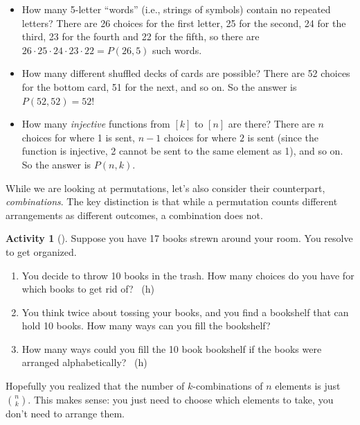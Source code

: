 \documentclass[10pt,]{book}
\theoremstyle{plain}
\theoremstyle{definition}
\theoremstyle{definition}
\theoremstyle{definition}
\newtheorem{activity}[project]{Activity}
\numberwithin{equation}{chapter}
\begin{document}
\begin{itemize}[label=\textbullet]
\item{}\hypertarget{p-654}{}%
How many 5-letter ``words'' (i.e., strings of symbols) contain no repeated letters?  There are 26 choices for the first letter, 25 for the second, 24 for the third, 23 for the fourth and 22 for the fifth, so there are \(26\cdot 25 \cdot 24 \cdot 23 \cdot 22 = P(26,5)\) such words.%
\item{}\hypertarget{p-655}{}%
How many different shuffled decks of cards are possible?  There are 52 choices for the bottom card, 51 for the next, and so on.  So the answer is \(P(52,52) = 52!\)%
\item{}\hypertarget{p-656}{}%
How many \emph{injective} functions from \([k]\) to \([n]\) are there?  There are \(n\) choices for where 1 is sent, \(n-1\) choices for where \(2\) is sent (since the function is injective, 2 cannot be sent to the same element as 1), and so on.  So the answer is \(P(n,k)\).%
\end{itemize}
%
\par
\hypertarget{p-657}{}%
While we are looking at permutations, let's also consider their counterpart, \emph{combinations}. The key distinction is that while a permutation counts different arrangements as different outcomes, a combination does not.%
\begin{activity}[]\label{activity-84}
\hypertarget{p-658}{}%
Suppose you have 17 books strewn around your room.  You resolve to get organized.%
\begin{enumerate}[font=\bfseries,label=(\alph*),ref=\alph*]
\item\label{task-133} \hypertarget{p-659}{}%
You decide to throw 10 books in the trash.  How many choices do you have for which books to get rid of?%
~{\tiny (h)}\item\label{task-134} \hypertarget{p-661}{}%
You think twice about tossing your books, and you find a bookshelf that can hold 10 books.  How many ways can you fill the bookshelf?%
\item\label{task-135} \hypertarget{p-662}{}%
How many ways could you fill the 10 book bookshelf if the books were arranged alphabetically?%
~{\tiny (h)}\end{enumerate}
\end{activity}
\hypertarget{p-664}{}%
Hopefully you realized that the number of \(k\)-combinations of \(n\) elements is just \(\binom{n}{k}\).  This makes sense: you just need to choose which elements to take, you don't need to arrange them.%
\par
\end{document}
